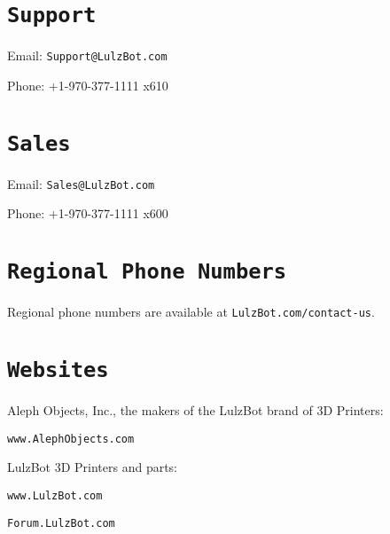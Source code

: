 %
%
%
%
%

\section{\texttt{Support}}
\setlength{\parindent}{0pt}
Email: \texttt{Support@LulzBot.com}

Phone: +1-970-377-1111 x610

\section{\texttt{Sales}}

Email: \texttt{Sales@LulzBot.com}

Phone: +1-970-377-1111 x600

\section{\texttt{Regional Phone Numbers}}
Regional phone numbers are available at \texttt{LulzBot.com/contact-us}.

\section{\texttt{Websites}}

Aleph Objects, Inc., the makers of the LulzBot\textsuperscript{\miniscule{\textregistered}} brand of 3D Printers:

\texttt{www.AlephObjects.com}


LulzBot 3D Printers and parts:

\texttt{www.LulzBot.com}

\texttt{Forum.LulzBot.com}
